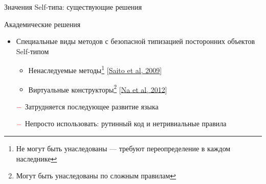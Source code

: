 \documentclass[usenames, dvipsnames]{beamer}
\begin{document}
    \begin{frame}[fragile]{Значения Self-типа: существующие решения}

        \begin{block}{Академические решения}
            \begin{itemize}
                \item Специальные виды методов с безопасной типизацией посторонних объектов Self-типом
                \begin{itemize}
                    \item Ненаследуемые методы\footnote{Не могут быть унаследованы --- требуют переопределение в каждом наследнике} [\href{http://www.fos.kuis.kyoto-u.ac.jp/~igarashi/papers/pdf/thistype-SAC09.pdf}{Saito et al, 2009}]
                    \item Виртуальные конструкторы\footnote{Могут быть унаследованы по сложным правилам} [\href{https://www.researchgate.net/profile/Sukyoung-Ryu/publication/254004584_Exact_type_parameterization_and_ThisType_support/links/54b90ed10cf269d8cbf72d01/Exact-type-parameterization-and-ThisType-support.pdf}{Na et al, 2012}]
                \end{itemize}
                \item[$\color{red} -$] Затрудняется последующее развитие языка
                \item[$\color{red} -$] Непросто использовать: рутинный код и нетривиальные правила
            \end{itemize}
        \end{block}


\end{frame}
\end{document}
